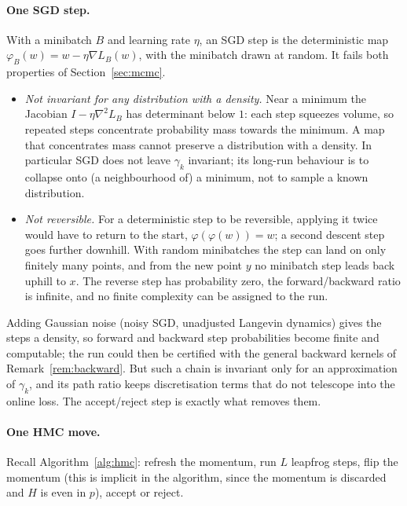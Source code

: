 \documentclass[11pt]{article}
\theoremstyle{definition}
\theoremstyle{remark}
\begin{document}
\paragraph{One SGD step.} With a minibatch $B$ and learning rate $\eta$, an SGD step is the deterministic map
$\varphi_B(w)=w-\eta\nabla L_B(w)$, with the minibatch drawn at random. It fails both properties of Section~\ref{sec:mcmc}.
\begin{itemize}[nosep]
\item \emph{Not invariant for any distribution with a density.} Near a minimum the Jacobian $I-\eta\nabla^2L_B$ has
  determinant below $1$: each step squeezes volume, so repeated steps concentrate probability mass towards the minimum.
  A map that concentrates mass cannot preserve a distribution with a density. In particular SGD does not leave $\gamma_k$
  invariant; its long-run behaviour is to collapse onto (a neighbourhood of) a minimum, not to sample a known distribution.
\item \emph{Not reversible.} For a deterministic step to be reversible, applying it twice would have to return to the
  start, $\varphi(\varphi(w))=w$; a second descent step goes further downhill. With random minibatches the step can land on
  only finitely many points, and from the new point $y$ no minibatch step leads back uphill to $x$. The reverse step has
  probability zero, the forward/backward ratio is infinite, and no finite complexity can be assigned to the run.
\end{itemize}
Adding Gaussian noise (noisy SGD, unadjusted Langevin dynamics) gives the steps a density, so forward and backward step
probabilities become finite and computable; the run could then be certified with the general backward kernels of
Remark~\ref{rem:backward}. But such a chain is invariant only for an approximation of $\gamma_k$, and its path ratio keeps
discretisation terms that do not telescope into the online loss. The accept/reject step is exactly what removes them.

\paragraph{One HMC move.} Recall Algorithm~\ref{alg:hmc}: refresh the momentum, run $L$ leapfrog steps, flip the momentum
(this is implicit in the algorithm, since the momentum is discarded and $H$ is even in $p$), accept or reject.
\end{document}
